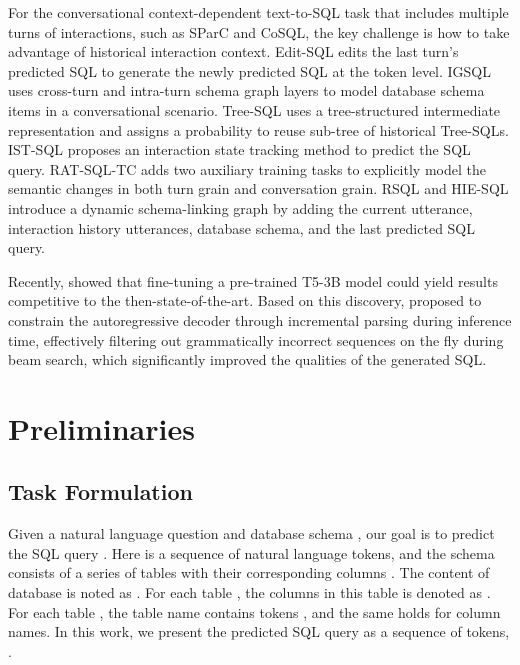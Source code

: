 \documentclass[11pt]{article}
\begin{document}
For the conversational context-dependent text-to-SQL task that includes multiple turns of interactions, such as SParC and CoSQL, the key challenge is how to take advantage of historical interaction context.
Edit-SQL \citep{zhang-etal-2019-editing} edits the last turn's predicted SQL to generate the newly predicted SQL at the token level. 
IGSQL \citep{cai-wan-2020-igsql} uses cross-turn and intra-turn schema graph layers to model database schema items in a conversational scenario. 
Tree-SQL \citep{wang2021interactive} uses a tree-structured intermediate representation and assigns a probability to reuse sub-tree of historical Tree-SQLs. 
IST-SQL \citep{wang2021tracking} proposes an interaction state tracking method to predict the SQL query.
RAT-SQL-TC \citep{2112.08735}adds two auxiliary training tasks to explicitly model the semantic changes in both turn grain and conversation grain.
RSQL \citep{hui2021dynamic} and HIE-SQL \citep{zheng2022hie} introduce a dynamic schema-linking graph by adding the current utterance, interaction history utterances, database schema, and the last predicted SQL query.



Recently, \citet{shaw-etal-2021-compositional} showed that fine-tuning a pre-trained T5-3B model could yield results competitive to the then-state-of-the-art. Based on this discovery, \citet{scholak-etal-2021-picard} proposed to constrain the autoregressive decoder through incremental parsing during inference time, effectively filtering out grammatically incorrect sequences on the fly during beam search, which significantly improved the qualities of the generated SQL. 




\section{Preliminaries}

\subsection{Task Formulation}
Given a natural language question  and database schema , our goal is to predict the SQL query . Here  is a sequence of natural language tokens, and the schema  consists of a series of tables  with their corresponding columns . The content of database  is noted as . For each table , the columns in this table is denoted as . For each table , the table name contains  tokens , and the same holds for column names. In this work, we present the predicted SQL query as a sequence of tokens, .
\end{document}
